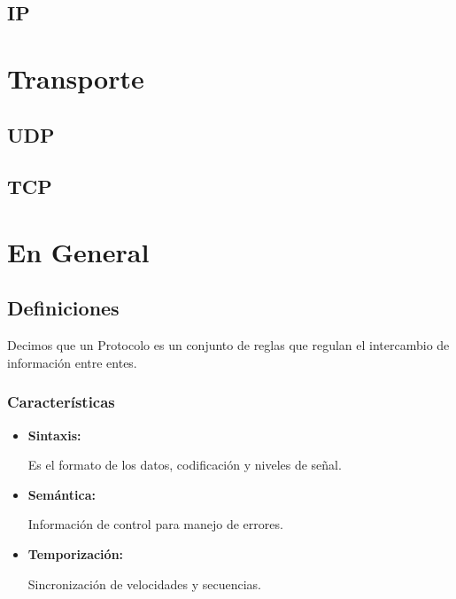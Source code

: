 \documentclass[12pt, fleqn]{report}                             %
\theoremstyle{break}                                            %
\begin{document}
        \section{IP}
    
    \chapter{Transporte}
        \section{UDP}
        \section{TCP}


    \chapter{En General}

        \clearpage
        \section{Definiciones}

            Decimos que un Protocolo es un conjunto de reglas que regulan el intercambio de
            información entre entes.

            \subsection{Características}

                \begin{itemize}
                    
                    \item \textbf{Sintaxis:}

                        Es el formato de los datos, codificación y niveles de señal.

                    \item \textbf{Semántica:}

                        Información de control para manejo de errores.

                    \item \textbf{Temporización:}

                        Sincronización de velocidades y secuencias.

                \end{itemize}
\end{document}
